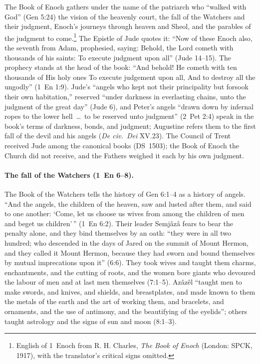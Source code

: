 The Book of Enoch gathers under the name of the patriarch who ``walked with
God'' (Gen 5:24) the vision of the heavenly court, the fall of the Watchers
and their judgment, Enoch's journeys through heaven and Sheol, and the
parables of the judgment to come.\footnote{English of 1~Enoch from R. H.
Charles, \emph{The Book of Enoch} (London: SPCK, 1917), with the
translator's critical signs omitted.} The Epistle of Jude quotes it:
``Now of these Enoch also, the seventh from Adam, prophesied, saying:
Behold, the Lord cometh with thousands of his saints: To execute judgment
upon all'' (Jude 14--15). The prophecy stands at the head of the book:
``And behold! He cometh with ten thousands of His holy ones To execute
judgement upon all, And to destroy all the ungodly'' (1~En 1:9). Jude's
``angels who kept not their principality but forsook their own habitation,''
reserved ``under darkness in everlasting chains, unto the judgment of the
great day'' (Jude 6), and Peter's angels ``drawn down by infernal ropes to
the lower hell~\dots\ to be reserved unto judgment'' (2~Pet 2:4) speak in
the book's terms of darkness, bonds, and judgment; Augustine refers them to
the first fall of the devil and his angels (\emph{De civ.\ Dei} XV.23). The
Council of Trent received Jude among
the canonical books (DS~1503); the Book of Enoch the Church did not receive,
and the Fathers weighed it each by his own judgment.

\paragraph{The fall of the Watchers (1~En 6--8).} The Book of the Watchers
tells the history of Gen 6:1--4 as a history of angels. ``And the angels,
the children of the heaven, saw and lusted after them, and said to one
another: `Come, let us choose us wives from among the children of men and
beget us children'\,'' (1~En 6:2). Their leader Semjâzâ fears to bear the
penalty alone, and they bind themselves by an oath: ``they were in all two
hundred; who descended in the days of Jared on the summit of Mount Hermon,
and they called it Mount Hermon, because they had sworn and bound themselves
by mutual imprecations upon it'' (6:6). They took wives and taught them
charms, enchantments, and the cutting of roots, and the women bore giants
who devoured the labour of men and at last men themselves (7:1--5). Azâzêl
``taught men to make swords, and knives, and shields, and breastplates, and
made known to them the metals of the earth and the art of working them, and
bracelets, and ornaments, and the use of antimony, and the beautifying of
the eyelids''; others taught astrology and the signs of sun and moon
(8:1--3).

